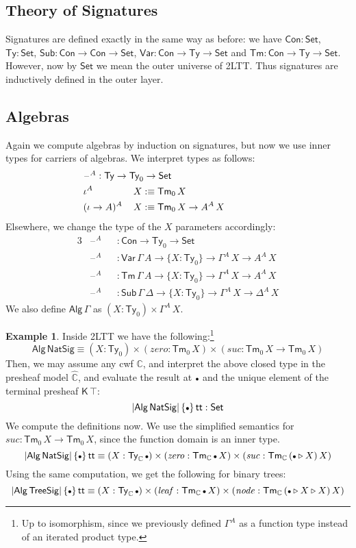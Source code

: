 \documentclass[12pt,a4paper,twoside,openany]{book}
\theoremstyle{remark}
\theoremstyle{definition}
\newtheorem{myexample}{Example}
\theoremstyle{theorem}
\newcommand{\mi}[1]{\mathit{#1}}
\newcommand{\ms}[1]{\mathsf{#1}}
\newcommand{\mbb}[1]{\mathbb{#1}}
\newcommand{\Con}{\mathsf{Con}}
\newcommand{\Sub}{\mathsf{Sub}}
\newcommand{\Tm}{\mathsf{Tm}}
\newcommand{\Ty}{\mathsf{Ty}}
\renewcommand{\tt}{\mathsf{tt}}
\newcommand{\blank}{\mathord{\hspace{1pt}\text{--}\hspace{1pt}}}
\newcommand{\Set}{\mathsf{Set}}
\newcommand{\ext}{\triangleright}
\newcommand{\emptycon}{\scaleobj{.75}\bullet}
\newcommand{\K}{\mathsf{K}}
\newcommand{\Var}{\ms{Var}}
\newcommand{\Alg}{\ms{Alg}}
\newcommand{\mbbC}{\mbb{C}}
\newcommand{\hmbbC}{\hat{\mbb{C}}}
\newcommand{\defn}{:\equiv}
\begin{document}
\subsection{Theory of Signatures}
Signatures are defined exactly in the same way as before: we have $\Con : \Set$,
$\Ty : \Set$, $\Sub : \Con \to \Con \to \Set$, $\Var : \Con \to \Ty \to \Set$ and
$\Tm : \Con \to \Ty \to \Set$. However, now by $\Set$ we mean the outer universe
of 2LTT. Thus signatures are inductively defined in the outer layer.

\subsection{Algebras}
\label{sec:2ltt-simple-algebras}

Again we compute algebras by induction on signatures, but now we use inner
types for carriers of algebras. We interpret types as follows:
\begin{alignat*}{3}
& \hspace{-4em} \rlap{$\blank^A : \Ty \to \Ty_0 \to \Set$} \\
& \hspace{-4em} \iota^A\,&&X \defn \Tm_0\,X \\
& \hspace{-4em} (\iota\to A)^A\,&&X \defn \Tm_0\,X \to A^A\,X
\end{alignat*}
Elsewhere, we change the type of the $X$ parameters accordingly:
\begin{alignat*}{3}
& \blank^A &&: \Con \to \Ty_0 \to \Set\\
& \blank^A &&: \Var\,\Gamma\,A \to \{X : \Ty_0\} \to \Gamma^A\,X \to A^A\,X\\
& \blank^A &&: \Tm\,\Gamma\,A \to \{X : \Ty_0\} \to \Gamma^A\,X \to A^A\,X\\
& \blank^A &&: \Sub\,\Gamma\,\Delta \to \{X : \Ty_0\} \to \Gamma^A\,X \to \Delta^A\,X
\end{alignat*}
We also define $\ms{Alg}\,\Gamma$ as $(X : \Ty_0) \times \Gamma^A\,X$.

\begin{myexample}
Inside 2LTT we have the following:\footnote{Up to isomorphism, since we previously defined $\Gamma^A$ as a function type instead of an iterated product type.}
\[ \Alg\,\ms{NatSig} \equiv (X : \Ty_0)\times(\mi{zero} : \Tm_0\,X)\times(\mi{suc} : \Tm_0\,X \to \Tm_0\,X) \]
Then, we may assume any cwf $\mbbC$, and interpret the above closed type in the
presheaf model $\hmbbC$, and evaluate the result at $\emptycon$ and
the unique element of the terminal presheaf $\K\,\top$:
\[
  |\Alg\,\ms{NatSig}|\,\{\emptycon\}\,\tt : \Set
\]
We compute the definitions now. We use the simplified semantics for $\mi{suc} :
\Tm_0\,X \to \Tm_0\,X$, since the function domain is an inner type.
\[
|\Alg\,\ms{NatSig}|\,\{\emptycon\}\,\tt \equiv
(X : \Ty_{\mbbC}\,\emptycon) \times (\mi{zero} : \Tm_{\mbbC}\,\emptycon\,X) \times (\mi{suc} : \Tm_{\mbbC}\,(\emptycon \ext X)\,X)
\]
Using the same computation, we get the following for binary trees:
\[
|\Alg\,\ms{TreeSig}|\,\{\emptycon\}\,\tt \equiv
(X : \Ty_{\mbbC}\,\emptycon) \times (\mi{leaf} : \Tm_{\mbbC}\,\emptycon\,X) \times (\mi{node} : \Tm_{\mbbC}\,(\emptycon \ext X \ext X)\,X)
\]
\end{myexample}
\end{document}
